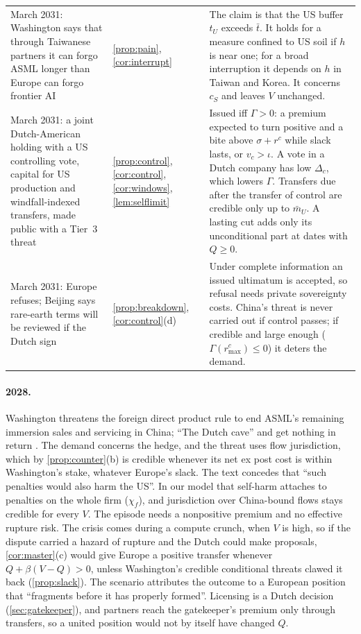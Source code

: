 \begin{table}[!tp]
\begin{tabularx}{\textwidth}{@{}>{\raggedright\arraybackslash}p{3.6cm}>{\raggedright\arraybackslash}p{2.3cm}>{\raggedright\arraybackslash}X@{}}
\addlinespace
March 2031: Washington says that through Taiwanese partners it can forgo ASML longer than Europe can forgo frontier AI &
\cref{prop:pain}, \cref{cor:interrupt} &
The claim is that the US buffer $t_U$ exceeds $\bar t$. It holds for a measure confined to US soil if $h$ is near one; for a broad interruption it depends on $h$ in Taiwan and Korea. It concerns $c_S$ and leaves $V$ unchanged.\\
\addlinespace
March 2031: a joint Dutch-American holding with a US controlling vote, capital for US production and windfall-indexed transfers, made public with a Tier~3 threat &
\cref{prop:control}, \cref{cor:control}, \cref{cor:windows}, \cref{lem:selflimit} &
Issued iff $\Gamma>0$: a premium expected to turn positive and a bite above $\sigma+r^c$ while slack lasts, or $v_c>\iota$. A vote in a Dutch company has low $\Delta_c$, which lowers $\Gamma$. Transfers due after the transfer of control are credible only up to $\bar m_U$. A lasting cut adds only its unconditional part at dates with $Q\ge 0$.\\
\addlinespace
March 2031: Europe refuses; Beijing says rare-earth terms will be reviewed if the Dutch sign &
\cref{prop:breakdown}, \cref{cor:control}(d) &
Under complete information an issued ultimatum is accepted, so refusal needs private sovereignty costs. China's threat is never carried out if control passes; if credible and large enough ($\Gamma(r^c_{\max})\le 0$) it deters the demand.\\
\bottomrule
\end{tabularx}
\end{table}

\paragraph{2028.} Washington threatens the foreign direct product rule to end ASML's remaining immersion sales and servicing in China; ``The Dutch cave'' and get nothing in return \citep{juijn2026europe}. The demand concerns the hedge, and the threat uses flow jurisdiction, which by \cref{prop:counter}(b) is credible whenever its net ex post cost is within Washington's stake, whatever Europe's slack. The text concedes that ``such penalties would also harm the US''. In our model that self-harm attaches to penalties on the whole firm ($\chi_f$), and jurisdiction over China-bound flows stays credible for every $V$. The episode needs a nonpositive premium and no effective rupture risk. The crisis comes during a compute crunch, when $V$ is high, so if the dispute carried a hazard of rupture and the Dutch could make proposals, \cref{cor:master}(c) would give Europe a positive transfer whenever $Q+\beta(V-Q)>0$, unless Washington's credible conditional threats clawed it back (\cref{prop:slack}). The scenario attributes the outcome to a European position that ``fragments before it has properly formed''. Licensing is a Dutch decision (\cref{sec:gatekeeper}), and partners reach the gatekeeper's premium only through transfers, so a united position would not by itself have changed $Q$.


